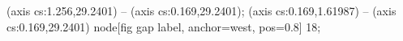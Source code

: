  (axis cs:1.256,29.2401) -- (axis cs:0.169,29.2401);
 (axis cs:0.169,1.61987) -- (axis cs:0.169,29.2401)
  node[fig gap label, anchor=west, pos=0.8] {\texttimes{}18};
